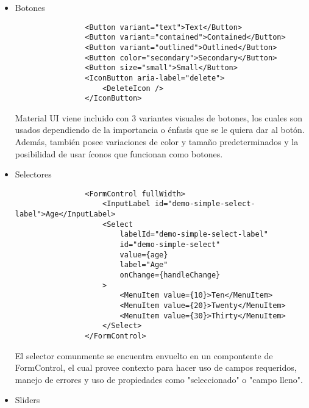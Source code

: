 \begin{itemize}
  \item Botones

        \begin{lstlisting}
                <Button variant="text">Text</Button>
                <Button variant="contained">Contained</Button>
                <Button variant="outlined">Outlined</Button>
                <Button color="secondary">Secondary</Button>
                <Button size="small">Small</Button>
                <IconButton aria-label="delete">
                    <DeleteIcon />
                </IconButton>
            \end{lstlisting}

        Material UI viene incluido con 3 variantes visuales de botones, los cuales son usados dependiendo de la importancia o énfasis que se le quiera dar al botón. Además, también posee variaciones de color y tamaño predeterminados y la posibilidad de usar íconos que funcionan como botones.

  \item Selectores

        \begin{lstlisting}
                <FormControl fullWidth>
                    <InputLabel id="demo-simple-select-label">Age</InputLabel>
                    <Select
                        labelId="demo-simple-select-label"
                        id="demo-simple-select"
                        value={age}
                        label="Age"
                        onChange={handleChange}
                    >
                        <MenuItem value={10}>Ten</MenuItem>
                        <MenuItem value={20}>Twenty</MenuItem>
                        <MenuItem value={30}>Thirty</MenuItem>
                    </Select>
                </FormControl>
            \end{lstlisting}

        El selector comunmente se encuentra envuelto en un compontente de FormControl, el cual provee contexto para hacer uso de campos requeridos, manejo de errores y uso de propiedades como "seleccionado" o "campo lleno".

  \item Sliders


\end{itemize}
